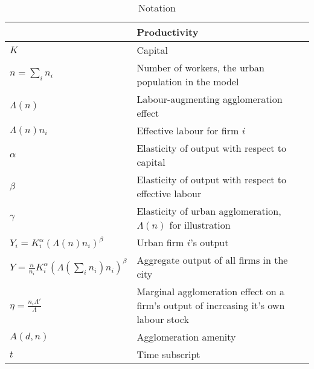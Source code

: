 \newpage
\begin{longtable}{lp{10cm}}
\caption{Notation} \\ \hline

		   &  \textbf{Productivity} \\ \hline
$K$       &  Capital \\
$n=\sum_i n_i$  &  Number of workers, the urban population in the model \\
$\Lambda(n)$    &  Labour-augmenting agglomeration effect \\
$\Lambda(n)n_i$ &  Effective labour for firm $i$ \\
$\alpha$  &  Elasticity of output with respect to capital \\
$\beta$   &  Elasticity of output with respect to effective labour \\
$\gamma$  &  Elasticity of urban agglomeration, $\Lambda(n)$ for illustration \\
$Y_i=K_i^{\alpha }(\Lambda(n)n_i)^{\beta }$  &  Urban firm $i$'s output \\
$Y=\frac{n}{n_i}K_i^{\alpha }(\Lambda(\sum_i n_i)n_i)^{\beta }$  &  Aggregate output of all firms in the city \\
$\eta=\frac{n_i\Lambda'}{\Lambda}$  &   Marginal agglomeration effect on a firm's output of increasing it's own labour stock \\
$A(d, n)$   &  Agglomeration amenity \\
$t$         &  Time subscript \\ \hline


\end{longtable}
